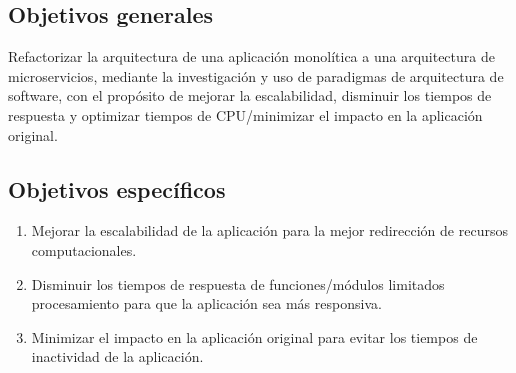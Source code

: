 
\subsection{Objetivos generales}
Refactorizar la arquitectura de una aplicación monolítica a una arquitectura de microservicios,
mediante la investigación y uso de paradigmas de arquitectura de software, con el propósito de
mejorar la escalabilidad, disminuir los tiempos de respuesta y optimizar tiempos de
CPU/minimizar el impacto en la aplicación original.

\subsection{Objetivos específicos}

\begin{enumerate}
  \item Mejorar la escalabilidad de la aplicación para la mejor redirección de recursos computacionales.
  \item Disminuir los tiempos de respuesta de funciones/módulos limitados procesamiento para que la aplicación sea más responsiva.
  \item Minimizar el impacto en la aplicación original para evitar los tiempos de inactividad de la aplicación.
\end{enumerate}


